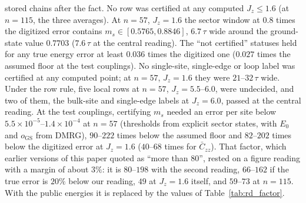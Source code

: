 \documentclass[aps,prx,onecolumn,10pt,nofootinbib,longbibliography,floatfix]{revtex4-2}
\theoremstyle{remark}
\newcommand{\Jz}{J_z}
\newcommand{\ms}{m_s}
\newcommand{\Czz}{\bar C_{zz}}
\newcommand{\GS}{\mathrm{GS}}
\begin{document}
stored chains after the fact. No row was certified at any computed $\Jz\le1.6$ (at $n=115$, the three averages).
At $n=57$, $\Jz=1.6$ the sector window at $0.8$ times the digitized error contains $\ms\in[0.5765,0.8846]$, $6.7\,\tau$ %
wide around the ground-state value $0.7703$ ($7.6\,\tau$ at the central reading). The ``not certified'' statuses held %
for any true energy error at least $0.036$ times the digitized one ($0.027$ times the assumed floor at the test %
couplings). No single-site, single-edge or loop label was certified at any computed point; at $n=57$, $\Jz=1.6$
they were $21$--$32\,\tau$ wide. Under the row rule, five local rows at $n=57$, $\Jz=5.5$--$6.0$, were undecided, and %
two of them, the bulk-site and single-edge labels at $\Jz=6.0$, passed at the central reading. At the test %
couplings, certifying $\ms$ needed an error per site below $5.5\times10^{-5}$--$1.4\times10^{-4}$ at $n=57$ (thresholds %
from explicit sector states, with $E_0$ and $o_\GS$ from DMRG), $90$--$222$ times below the assumed floor and %
$82$--$202$ times below the digitized error at $\Jz=1.6$ ($40$--$68$ times for $\Czz$). That factor, which earlier %
versions of this paper quoted as ``more than $80$'', rested on a figure reading with a margin of about $3\%$: it is %
$80$--$198$ with the second reading, $66$--$162$ if the true error is $20\%$ below our reading, $49$ at $\Jz=1.6$ %
itself, and $59$--$73$ at $n=115$. With the public energies it is replaced by the values of Table~\ref{tab:rd_factor}. %
\end{document}
